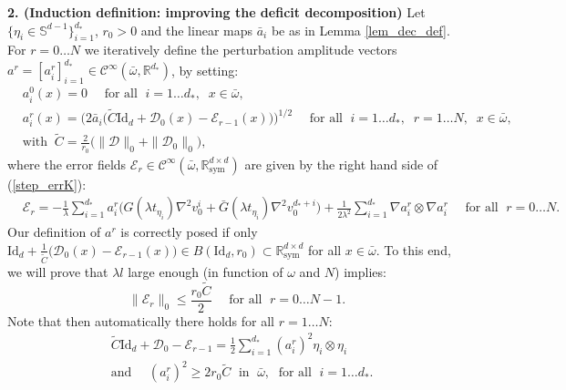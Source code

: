 \documentclass[reqno,twoside,11pt]{amsart}
\newcommand{\sym}{\mathrm{sym}}
\newcommand{\Id}{\mathrm{Id}}
\newcommand{\R}{\mathbb{R}}
\numberwithin{equation}{section}
\theoremstyle{plain}
\theoremstyle{definition}
\begin{document}
{\bf 2. (Induction definition: improving the deficit decomposition)}  Let
$\{\eta_i\in\mathbb{S}^{d-1}\}_{i=1}^{d_*}$, $r_0>0$ and the linear maps ${\bar a}_i$ be as in Lemma
\ref{lem_dec_def}. For $r=0\ldots N$ we iteratively define the perturbation amplitude vectors
$a^r = [a_i^r]_{i=1}^{d_*}\in\mathcal{C}^\infty(\bar\omega,\R^{d_*})$, by setting:
\begin{equation*}
\begin{split}
& a_i^0(x)=0 \quad \mbox{ for all }\; i=1\ldots d_*, \;\; x\in\bar\omega,
\\ & a^r_i(x)= \Big(2\bar a_i\big(\tilde C\Id_d + \mathcal{D}_0(x)-\mathcal{E}_{r-1}(x)\big)\Big)^{1/2} 
\quad \mbox{ for all }\; i=1\ldots d_*, \; \; r = 1\ldots N,\;\; x\in\bar\omega,
\\ &  \mbox{with } ~\tilde C= \frac{2}{r_0}\Big(\|\mathcal{D}\|_0 + \|\mathcal{D}_0\|_0\Big),
\end{split}
\end{equation*}
where the error fields $\mathcal{E}_r \in\mathcal{C}^\infty(\bar\omega,\R^{d\times d}_\sym)$ are given
by the right hand side of (\ref{step_errK}):
\begin{equation*}
\begin{split}
& \mathcal{E}_{r}=-\frac{1}{\lambda} \sum_{i=1}^{d_*}a_i^r \Big(G(\lambda t_{\eta_i})\nabla^2 v_0^i +
\bar G(\lambda t_{\eta_i})\nabla^2 v_0^{d_*+i}\Big) +
\frac{1}{2\lambda^2} \sum_{i=1}^{d_*} \nabla a_i^r\otimes \nabla a_i^r
\quad \mbox{ for all }\; r = 0\ldots N.
\end{split}
\end{equation*}
Our definition of $a^r$ is correctly posed if only $\Id_d + \frac{1}{\tilde C}\big
(\mathcal{D}_0 (x)-\mathcal{E}_{r-1}(x)\big)\in
B(\Id_d,r_0)\subset\R^{d\times d}_\sym$ for all $x\in \bar\omega$. 
To this end, we will prove that $\lambda l$ large enough (in
function of $\omega$ and $N$) implies:
\begin{equation}\label{need_errK}
\|\mathcal{E}_r\|_0\leq \frac{r_0\tilde C }{2} \quad \mbox{ for all } \; r=0\ldots N-1.
\end{equation}
Note that then automatically there holds for all $r=1\ldots N$:
\begin{equation}\label{low_bd_asK}
\begin{split}
& \tilde C\Id_d + \mathcal{D}_0-\mathcal{E}_{r-1} = \frac{1}{2}\sum_{i=1}^{d_*}
(a_i^r)^2\eta_i\otimes\eta_i \\ & \mbox{and }\quad (a_i^r)^2\geq
2r_0\tilde C \;\mbox{ in } \;\bar\omega,\;\mbox{ for all } \; i=1\ldots d_*.
\end{split}
\end{equation}
\end{document}
